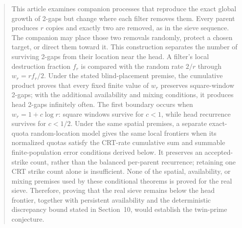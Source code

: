 \begin{abstract}
This article examines companion processes that reproduce the exact global growth of 2-gaps but change where each filter removes them. Every parent produces $r$ copies and exactly two are removed, as in the sieve sequence. The companion may place those two removals randomly, protect a chosen target, or direct them toward it. This construction separates the number of surviving 2-gaps from their location near the head.
A filter's local destruction fraction $f_r$ is compared with the random rate $2/r$ through $w_r=rf_r/2$. Under the stated blind-placement premise, the cumulative product proves that every fixed finite value of $w_r$ preserves square-window 2-gaps; with the additional availability and mixing conditions, it produces head 2-gaps infinitely often. The first boundary occurs when $w_r=1+c\log r$: square windows survive for $c < 1$, while head recurrence survives for $c < 1/2$. Under the same spatial premises, a separate exact-quota random-location model gives the same local frontiers when its normalized quotas satisfy the CRT-rate cumulative sum and summable finite-population error conditions derived below. It preserves an accepted-strike count, rather than the balanced per-parent recurrence; retaining one CRT strike count alone is insufficient. None of the spatial, availability, or mixing premises used by these conditional theorems is proved for the real sieve. Therefore, proving that the real sieve remains below the head frontier, together with persistent availability and the deterministic discrepancy bound stated in Section~10, would establish the twin-prime conjecture.
\end{abstract}
